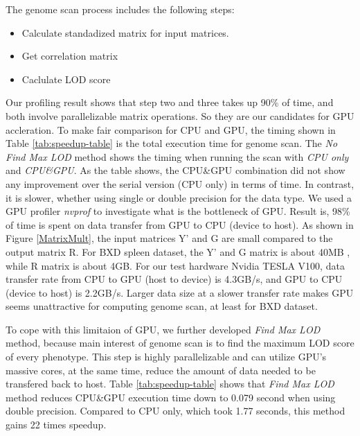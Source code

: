 \documentclass[9pt,twocolumn,twoside,lineno]{gsag3jnl}
\begin{document}
The genome scan process includes the following steps:
\begin{itemize}
	\item Calculate standadized matrix for input matrices.
	\item Get correlation matrix
	\item Caclulate LOD score
\end{itemize}
Our profiling result shows that step two and three takes up 90\% of time, and both involve parallelizable matrix operations. 
So they are our candidates for GPU accleration.
To make fair comparison for CPU and GPU, the timing shown in Table \ref{tab:speedup-table} is the total execution time for genome scan. 
The \textit{No Find Max LOD} method shows the timing when running the scan with \textit{CPU only} and \textit{CPU\&GPU}.
As the table shows, the CPU\&GPU combination did not show any improvement over the serial version (CPU only) in terms of time. 
In contrast, it is slower, whether using single or double precision for the data type.
We used a GPU profiler \textit{nvprof} %
to investigate what is the bottleneck of GPU. 
Result is, 98\% of time is spent on data transfer from GPU to CPU (device to host).
As shown in Figure \ref{MatrixMult}, the input matrices Y' and G are small compared to the output matrix R.
For BXD spleen dataset, the Y' and G matrix is about 40MB %
, while R matrix is about 4GB.
For our test hardware Nvidia TESLA V100, data transfer rate from CPU to GPU (host to device) is 4.3GB/s, and GPU to CPU (device to host) is 2.2GB/s. %
Larger data size at a slower transfer rate makes GPU seems unattractive for computing genome scan, at least for BXD dataset.

To cope with this limitaion of GPU, we further developed \textit{Find Max LOD} method, because main interest of genome scan is to find the maximum LOD score of every phenotype. 
This step is highly parallelizable and can utilize GPU's massive cores, at the same time, reduce the amount of data needed to be transfered back to host. 
Table \ref{tab:speedup-table} shows that \textit{Find Max LOD} method reduces CPU\&GPU execution time down to 0.079 second when using double precision. 
Compared to CPU only, which took 1.77 seconds, this method gains 22 times speedup. 
\end{document}
